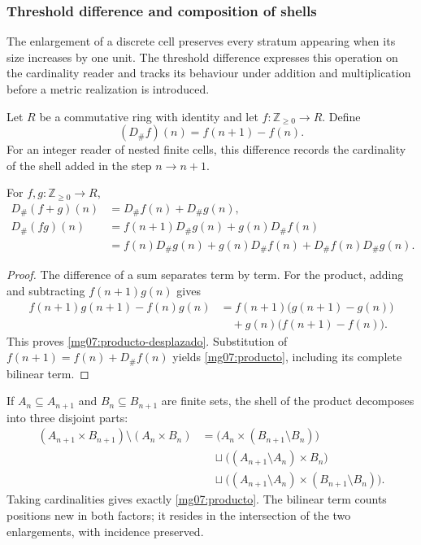 \subsubsection{Threshold difference and composition of shells}
\label{mg07:umbral}

The enlargement of a discrete cell preserves every stratum appearing
when its size increases by one unit. The threshold difference expresses
this operation on the cardinality reader and tracks its behaviour under
addition and multiplication before a metric realization is introduced.

\begin{definition}
Let \(R\) be a commutative ring with identity and let
\(f:\mathbb Z_{\geq0}\to R\). Define
\begin{equation}
 (D_\#f)(n)=f(n+1)-f(n).
 \label{mg07:definicion}
\end{equation}
For an integer reader of nested finite cells, this difference records
the cardinality of the shell added in the step \(n\to n+1\).
\end{definition}

\begin{proposition}
For \(f,g:\mathbb Z_{\geq0}\to R\),
\begin{align}
 D_\#(f+g)(n)&=D_\#f(n)+D_\#g(n),
 \label{mg07:aditividad}\\
 D_\#(fg)(n)&=f(n+1)D_\#g(n)+g(n)D_\#f(n)
 \label{mg07:producto-desplazado}\\
 &=f(n)D_\#g(n)+g(n)D_\#f(n)
   +D_\#f(n)D_\#g(n).
 \label{mg07:producto}
\end{align}
\end{proposition}

\begin{proof}
The difference of a sum separates term by term. For the product,
adding and subtracting \(f(n+1)g(n)\) gives
\[
 \begin{split}
 f(n+1)g(n+1)-f(n)g(n)
 &=f(n+1)\bigl(g(n+1)-g(n)\bigr)\\
 &\quad+g(n)\bigl(f(n+1)-f(n)\bigr).
 \end{split}
\]
This proves \eqref{mg07:producto-desplazado}. Substitution of
\(f(n+1)=f(n)+D_\#f(n)\) yields \eqref{mg07:producto}, including
its complete bilinear term.
\end{proof}

If \(A_n\subseteq A_{n+1}\) and \(B_n\subseteq B_{n+1}\) are
finite sets, the shell of the product decomposes into three disjoint
parts:
\[
 \begin{split}
 (A_{n+1}\times B_{n+1})\setminus(A_n\times B_n)
 &=\bigl(A_n\times(B_{n+1}\setminus B_n)\bigr)\\
 &\quad\sqcup\bigl((A_{n+1}\setminus A_n)\times B_n\bigr)\\
 &\quad\sqcup\bigl((A_{n+1}\setminus A_n)
                 \times(B_{n+1}\setminus B_n)\bigr).
 \end{split}
\]
Taking cardinalities gives exactly \eqref{mg07:producto}. The
bilinear term counts positions new in both factors; it resides in
the intersection of the two enlargements, with incidence preserved.

